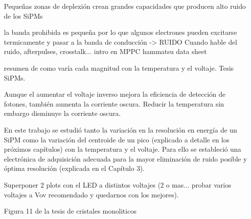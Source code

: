 Pequeñas zonas de deplexión crean grandes capacidades que producen alto ruido de los SiPMs

la banda prohibida es pequeña por lo que algunos electrones pueden excitarse termicamente y pasar a la banda de conducción -> RUIDO
Cuando hable del ruido, afterpulses, crosstalk... intro en MPPC hammatsu data sheet

resumen de como varía cada magnitud con la temperatura y el voltaje. Tesis SiPMs.

Aunque el aumentar el voltaje inverso mejora la eficiencia de detección de fotones, también aumenta la corriente oscura. Reducir la temperatura sin embargo disminuye la corriente oscura.

En este trabajo se estudió tanto la variación en la resolución en energía de un SiPM como la variación del centroide de un pico (explicado a detalle en los próximos capítulos) con la temperatura y el voltaje. Para ello se estableció una electrónica de adquisición adecuada para la mayor eliminación de ruido posible y óptima resolución (explicada en el Capítulo 3).


Superponer 2 plots con el LED a distintos voltajes (2 o mas... probar varios voltajes a Vov recomendado y quedarnos con los mejores).

Figura 11 de la tesis de cristales monoliticos
